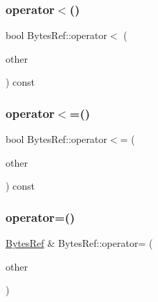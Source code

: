 \subsubsection{\texorpdfstring{operator$<$()}{operator<()}}
{\footnotesize\ttfamily bool Bytes\+Ref\+::operator$<$ (\begin{DoxyParamCaption}\item[{const \mbox{\hyperlink{classlucene_1_1core_1_1util_1_1BytesRef}{Bytes\+Ref}} \&}]{other }\end{DoxyParamCaption}) const}

\mbox{\label{classlucene_1_1core_1_1util_1_1BytesRef_a819f7a557975f9a9145bf62c50a1fcee}} 
\subsubsection{\texorpdfstring{operator$<$=()}{operator<=()}}
{\footnotesize\ttfamily bool Bytes\+Ref\+::operator$<$= (\begin{DoxyParamCaption}\item[{const \mbox{\hyperlink{classlucene_1_1core_1_1util_1_1BytesRef}{Bytes\+Ref}} \&}]{other }\end{DoxyParamCaption}) const}

\mbox{\label{classlucene_1_1core_1_1util_1_1BytesRef_a83163bf442814183adc151dccf70bc73}} 
\subsubsection{\texorpdfstring{operator=()}{operator=()}}
{\footnotesize\ttfamily \mbox{\hyperlink{classlucene_1_1core_1_1util_1_1BytesRef}{Bytes\+Ref}} \& Bytes\+Ref\+::operator= (\begin{DoxyParamCaption}\item[{const \mbox{\hyperlink{classlucene_1_1core_1_1util_1_1BytesRef}{Bytes\+Ref}} \&}]{other }\end{DoxyParamCaption})}

